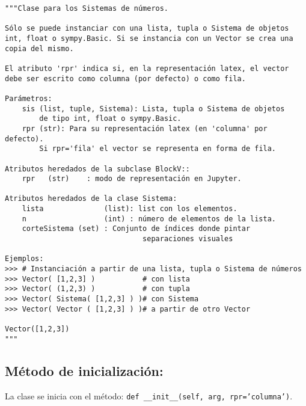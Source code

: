 \documentclass[11pt]{report}
\begin{document}
\begin{verbatim}
"""Clase para los Sistemas de números.

Sólo se puede instanciar con una lista, tupla o Sistema de objetos
int, float o sympy.Basic. Si se instancia con un Vector se crea una
copia del mismo.

El atributo 'rpr' indica si, en la representación latex, el vector
debe ser escrito como columna (por defecto) o como fila.

Parámetros:
    sis (list, tuple, Sistema): Lista, tupla o Sistema de objetos
        de tipo int, float o sympy.Basic.
    rpr (str): Para su representación latex (en 'columna' por defecto).
        Si rpr='fila' el vector se representa en forma de fila. 

Atributos heredados de la subclase BlockV::
    rpr   (str)    : modo de representación en Jupyter.

Atributos heredados de la clase Sistema:
    lista              (list): list con los elementos.
    n                  (int) : número de elementos de la lista.
    corteSistema (set) : Conjunto de índices donde pintar
                                separaciones visuales

Ejemplos:
>>> # Instanciación a partir de una lista, tupla o Sistema de números
>>> Vector( [1,2,3] )           # con lista
>>> Vector( (1,2,3) )           # con tupla
>>> Vector( Sistema( [1,2,3] ) )# con Sistema
>>> Vector( Vector ( [1,2,3] ) )# a partir de otro Vector

Vector([1,2,3])
"""
\end{verbatim}

\subsection{Método de inicialización:}
\label{sec:org9eee0d7}

La clase se inicia con el método: \texttt{def \_\_init\_\_(self, arg, rpr='columna')}.
\end{document}
